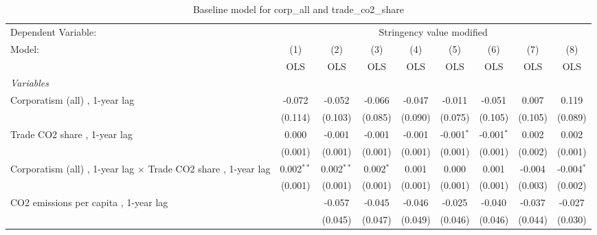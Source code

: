 
\begin{table}[htbp]
   \caption{Baseline model for corp\_all and trade\_co2\_share}
   \centering
   \begin{tabular}{lcccccccc}
      \toprule
      Dependent Variable: & \multicolumn{8}{c}{Stringency value modified}\\
      Model:                                                                & (1)          & (2)          & (3)         & (4)     & (5)           & (6)           & (7)           & (8)\\  
                                                                            &  OLS         & OLS          & OLS         & OLS     & OLS           & OLS           & OLS           & OLS\\  
      \midrule
      \emph{Variables}\\
      Corporatism (all) , 1-year lag                                        & -0.072       & -0.052       & -0.066      & -0.047  & -0.011        & -0.051        & 0.007         & 0.119\\   
                                                                            & (0.114)      & (0.103)      & (0.085)     & (0.090) & (0.075)       & (0.105)       & (0.105)       & (0.089)\\   
      Trade CO2 share , 1-year lag                                          & 0.000        & -0.001       & -0.001      & -0.001  & -0.001$^{*}$  & -0.001$^{*}$  & 0.002         & 0.002\\   
                                                                            & (0.001)      & (0.001)      & (0.001)     & (0.001) & (0.001)       & (0.001)       & (0.002)       & (0.001)\\   
      Corporatism (all) , 1-year lag $\times$ Trade CO2 share , 1-year lag  & 0.002$^{**}$ & 0.002$^{**}$ & 0.002$^{*}$ & 0.001   & 0.000         & 0.001         & -0.004        & -0.004$^{*}$\\   
                                                                            & (0.001)      & (0.001)      & (0.001)     & (0.001) & (0.001)       & (0.001)       & (0.003)       & (0.002)\\   
      CO2 emissions per capita , 1-year lag                                 &              & -0.057       & -0.045      & -0.046  & -0.025        & -0.040        & -0.037        & -0.027\\   
                                                                            &              & (0.045)      & (0.047)     & (0.049) & (0.046)       & (0.046)       & (0.044)       & (0.030)\\   

\end{tabular}
\end{table}
